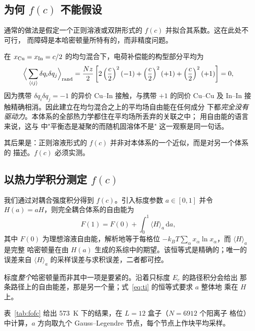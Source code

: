 \documentclass[11pt,a4paper]{ctexart}
\begin{document}
\subsection{为何 $f(c)$ 不能假设}
\label{sec:whynotregular}

通常的做法是假定一个正则溶液或双阱形式的 $f(c)$ 并拟合其系数。这在此处不可行，
而障碍是本哈密顿量所特有的，而非精度问题。

在 $x_{\rm Cu} = x_{\rm In} = c/2$ 的均匀混合下，电荷补偿能的构型部分平均为
\begin{equation}
\Big\langle \sum_{\langle ij \rangle} \delta q_i \delta q_j \Big\rangle_{\rm rand}
= \frac{Nz}{2}\left[ 2\left(\frac{c}{2}\right)^2(-1)
                   + \left(\frac{c}{2}\right)^2(+1)
                   + \left(\frac{c}{2}\right)^2(+1) \right] = 0,
\label{eq:mfzero}
\end{equation}
因为携带 $\delta q_i \delta q_j = -1$ 的异价 Cu--In 接触，与携带 $+1$ 的同价
Cu--Cu 及 In--In 接触精确相消。因此建立在均匀混合之上的平均场自由能在任何成分
下都\emph{完全没有驱动力}。本体系的全部热力学都住在平均场所丢弃的关联之中；
用自由能的语言来说，这与 \citet{yu2026b} 中"平衡态是凝聚的而随机固溶体不是"
这一观察是同一句话。

其后果是：正则溶液形式的 $f(c)$ 并非对本体系的一个近似，而是对另一个体系的
描述。$f(c)$ 必须实测。

\subsection{以热力学积分测定 $f(c)$}
\label{sec:fofc}

我们通过对耦合强度积分得到 $f(c)$。引入标度参数 $a \in [0,1]$ 并令
$H(a) = aH$，则完全耦合体系的自由能为
\begin{equation}
F(1) = F(0) + \int_0^1 \langle H \rangle_a \, \mathrm{d}a,
\label{eq:ti}
\end{equation}
其中 $F(0)$ 为理想溶液自由能，解析地等于每格位
$-k_BT \sum_\alpha x_\alpha \ln x_\alpha$，而 $\langle H \rangle_a$ 是完整
哈密顿量在由 $H(a)$ 生成的系综中的期望。该恒等式是精确的；唯一的误差来自
$\langle H \rangle_a$ 的采样误差与求积误差，二者都可控。

标度\emph{整个}哈密顿量而非其中一项是要紧的。沿着只标度 $E_c$ 的路径积分会给出
那条路径上的自由能差，那是另一个量；式~\eqref{eq:ti} 的恒等式要求 $a$ 整体地
乘在 $H$ 上。

表~\ref{tab:fofc} 给出 573~K 下的结果，在 $L = 12$ 盒子（$N = 6912$ 个阳离子
格位）中计算，$a$ 方向取九个 Gauss--Legendre 节点，每个节点上作块平均采样。
\end{document}
